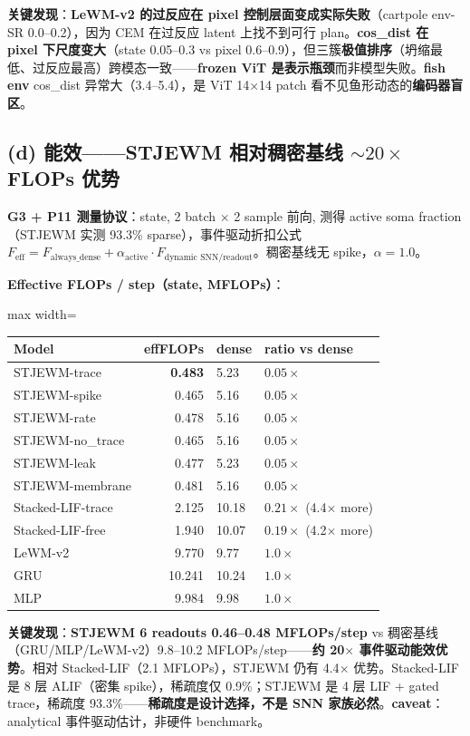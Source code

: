 \documentclass[11pt,a4paper]{article}
\begin{document}
\textbf{关键发现}：\textbf{LeWM-v2 的过反应在 pixel 控制层面变成实际失败}（cartpole env-SR 0.0--0.2），因为 CEM 在过反应 latent 上找不到可行 plan。\textbf{cos\_dist 在 pixel 下尺度变大}（state 0.05--0.3 vs pixel 0.6--0.9），但三簇\textbf{极值排序}（坍缩最低、过反应最高）跨模态一致——\textbf{frozen ViT 是表示瓶颈}而非模型失败。\textbf{fish env} cos\_dist 异常大（3.4--5.4），是 ViT 14×14 patch 看不见鱼形动态的\textbf{编码器盲区}。

\subsection{(d) 能效——STJEWM 相对稠密基线 $\sim 20\times$ FLOPs 优势}

\textbf{G3 + P11 测量协议}：state, 2 batch × 2 sample 前向, 测得 active soma fraction（STJEWM 实测 93.3\% sparse），事件驱动折扣公式 $F_{\text{eff}} = F_{\text{always\_dense}} + \alpha_{\text{active}} \cdot F_{\text{dynamic SNN/readout}}$。稠密基线无 spike，$\alpha=1.0$。

\textbf{Effective FLOPs / step（state, MFLOPs）}：
\begin{adjustbox}{max width=\textwidth}
\scriptsize
\begin{tabular}{lrll}
\toprule
\textbf{Model} & \textbf{effFLOPs} & \textbf{dense} & \textbf{ratio vs dense} \\
\midrule
STJEWM-trace & \textbf{0.483} & 5.23 & $0.05\times$ \\
STJEWM-spike & 0.465 & 5.16 & $0.05\times$ \\
STJEWM-rate & 0.478 & 5.16 & $0.05\times$ \\
STJEWM-no\_trace & 0.465 & 5.16 & $0.05\times$ \\
STJEWM-leak & 0.477 & 5.23 & $0.05\times$ \\
STJEWM-membrane & 0.481 & 5.16 & $0.05\times$ \\
Stacked-LIF-trace & 2.125 & 10.18 & $0.21\times$ (4.4$\times$ more) \\
Stacked-LIF-free & 1.940 & 10.07 & $0.19\times$ (4.2$\times$ more) \\
LeWM-v2 & 9.770 & 9.77 & $1.0\times$ \\
GRU & 10.241 & 10.24 & $1.0\times$ \\
MLP & 9.984 & 9.98 & $1.0\times$ \\
\bottomrule
\end{tabular}
\end{adjustbox}

\textbf{关键发现}：\textbf{STJEWM 6 readouts 0.46--0.48 MFLOPs/step} vs 稠密基线（GRU/MLP/LeWM-v2）9.8--10.2 MFLOPs/step——\textbf{约 20$\times$ 事件驱动能效优势}。相对 Stacked-LIF（2.1 MFLOPs），STJEWM 仍有 4.4$\times$ 优势。Stacked-LIF 是 8 层 ALIF（密集 spike），稀疏度仅 0.9\%；STJEWM 是 4 层 LIF + gated trace，稀疏度 93.3\%——\textbf{稀疏度是设计选择，不是 SNN 家族必然}。\textbf{caveat}：analytical 事件驱动估计，非硬件 benchmark。
\end{document}
